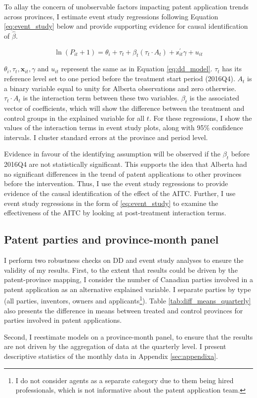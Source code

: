 \documentclass[../main.tex]{subfiles}
\begin{document}
To allay the concern of unobservable factors impacting patent application trends across provinces, I estimate event study regressions following Equation \ref{eq:event_study} below and provide supporting evidence for causal identification of $\hat{\beta}$.

\begin{equation}
    \label{eq:event_study}
   \ln(P_{it} + 1) = \theta_i + \tau_t + \beta_t (\tau_t \cdot A_t) + \mathbb{x}_{it}^{'}\gamma + u_{it}
\end{equation}

$\theta_i, \tau_t, \mathbf{x}_{it}, \gamma$ and $u_{it}$ represent the same as in Equation \ref{eq:dd_model}. $\tau_t$ has its reference level set to one period before the treatment start period (2016Q4). $A_t$ is a binary variable equal to unity for Alberta observations and zero otherwise. $\tau_t \cdot A_t$ is the interaction term between these two variables. $\beta_t$ is the associated vector of coefficients, which will show the difference between the treatment and control groups in the explained variable for all $t$. For these regressions, I show the values of the interaction terms in event study plots, along with 95\% confidence intervals. I cluster standard errors at the province and period level.

Evidence in favour of the identifying assumption will be observed if the $\beta_t$ before 2016Q4 are not statistically significant. This supports the idea that Alberta had no significant differences in the trend of patent applications to other provinces before the intervention. Thus, I use the event study regressions to provide evidence of the causal identification of the effect of the AITC. Further, I use event study regressions in the form of \ref{eq:event_study} to examine the effectiveness of the AITC by looking at post-treatment interaction terms.

\subsection{Patent parties and province-month panel}

I perform two robustness checks on DD and event study analyses to ensure the validity of my results. First, to the extent that results could be driven by the patent-province mapping, I consider the number of Canadian parties involved in a patent application as an alternative explained variable. I separate parties by type (all parties, inventors, owners and applicants\footnote{I do not consider agents as a separate category due to them being hired professionals, which is not informative about the patent application team.}). Table \ref{tab:diff_means_quarterly} also presents the difference in means between treated and control provinces for parties involved in patent applications.

Second, I reestimate models on a province-month panel, to ensure that the results are not driven by the aggregation of data at the quarterly level. I present descriptive statistics of the monthly data in Appendix \ref{sec:appendixa}. 
\end{document}
